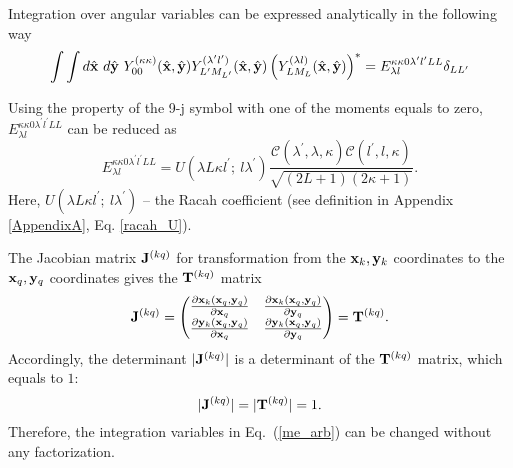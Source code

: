 \documentclass[
12pt, %
oneside, %
english, %
onehalfspacing, %
onehalfspacing, %
headsepline, %
]{MastersDoctoralThesis} %
\begin{document}
Integration over angular variables can be expressed analytically in the following way
\begin{align}
\int \int d\hat{\bf x}~d\hat{\bf y}~ Y_{00}^{(\kappa\kappa)}(\hat{{\bf x}},\hat{{\bf y}})  Y_{L^{\prime}M_{L^{\prime}}}^{(\lambda^{\prime} l^{\prime})}(\hat{{\bf x}},\hat{{\bf y}}) \left(  Y_{LM_L}^{(\lambda l)}(\hat{{\bf x}},\hat{{\bf y}}) \right)^{*} =  {E}^{\kappa \kappa 0 \lambda^{\prime} l^{\prime} L L}_{\lambda l} \delta_{LL^{\prime}} 
\label{angular_part_overlap1}
\end{align}

Using the property of the 9-j symbol with one of the moments equals to zero, ${E}^{\kappa \kappa 0 \lambda^{\prime} l^{\prime} L L}_{\lambda l}$ can be reduced as
\begin{equation}
{E}^{\kappa \kappa 0 \lambda^{\prime} l^{\prime} L L}_{\lambda l}
=U\left(  \lambda L \kappa l^{\prime};~ l \lambda^{\prime} \right) \frac{\mathcal{C} \left( \lambda^{\prime}, \lambda, \kappa \right) \mathcal{C} \left( l^{\prime}, l, \kappa \right) }{ \sqrt{\left( 2L+1 \right) \left( 2\kappa +1 \right)}}.
\end{equation}
Here, $U\left(  \lambda L \kappa l^{\prime};~ l \lambda^{\prime} \right)$ -- the Racah coefficient  (see definition in Appendix \ref{AppendixA}, Eq. \ref{racah_U}).

The Jacobian  matrix ${\bf J}^{(kq)}$ for transformation from the ${\bf x}_k, {\bf y}_k$ coordinates to the ${\bf x}_q, {\bf y}_q$ coordinates gives the ${\bf T}^{(kq)}$ matrix
\begin{equation}
{\bf J}^{(kq)} = 
\begin{pmatrix}
\frac{\partial {\bf x}_k \left({\bf x}_q,{\bf y}_q \right)}{ \partial {\bf x}_q }  
& \frac{\partial {\bf x}_k \left({\bf x}_q,{\bf y}_q \right)}{ \partial {\bf y}_q } \\
\frac{\partial {\bf y}_k \left({\bf x}_q,{\bf y}_q \right)}{ \partial {\bf x}_q }  
& \frac{\partial {\bf y}_k \left({\bf x}_q,{\bf y}_q \right)}{ \partial {\bf y}_q } 
\end{pmatrix} = {\bf T}^{(kq)}.
\end{equation}
Accordingly, the determinant $\vert {\bf J}^{(kq)} \vert$ is a determinant of the ${\bf T}^{(kq)}$ matrix, which equals to $1$:
\begin{equation}
\vert {\bf J}^{(kq)} \vert = \vert {\bf T}^{(kq)} \vert =1.
\end{equation}
  Therefore, the integration variables in Eq.~(\ref{me_arb}) can be changed without any factorization. 
  
\end{document}
